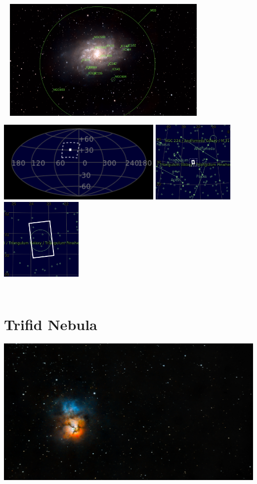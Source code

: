 \begin{center}
 \ \newpage
\includegraphics[width=0.75\textwidth]{../Imaging//Annotated/Triangulum_Galaxy_Annotated.jpg}

\includegraphics[height=4cm]{../Imaging//Annotated/Triangulum_Galaxy_Globe.jpg}
\includegraphics[height=4cm]{../Imaging//Annotated/Triangulum_Galaxy_Close.jpg}
\includegraphics[height=4cm]{../Imaging//Annotated/Triangulum_Galaxy_Closer.jpg}
\end{center}
\ \\\section{Trifid Nebula}
\includegraphics[width=\textwidth]{../Imaging//Original/Trifid_Nebula.jpg}
